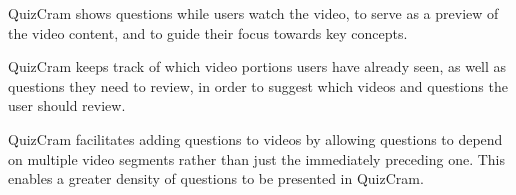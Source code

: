 \documentclass{sigchi}
\begin{document}
\begin{compactitem}
\item QuizCram shows questions while users watch the video, to serve as a preview of the video content, and to guide their focus towards key concepts.
\item QuizCram keeps track of which video portions users have already seen, as well as questions they need to review, in order to suggest which videos and questions the user should review.
\item QuizCram facilitates adding questions to videos by allowing questions to depend on multiple video segments rather than just the immediately preceding one. This enables a greater density of questions to be presented in QuizCram.
\end{compactitem}
\end{document}
